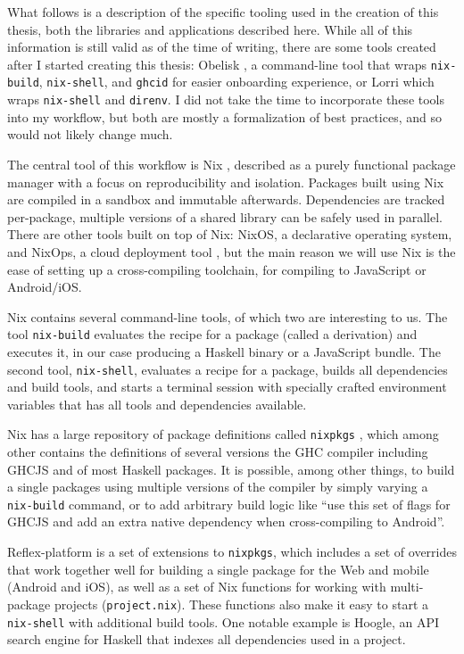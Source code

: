 \documentclass[english,zadani,odsaz]{fitthesis}
\begin{document}
What follows is a description of the specific tooling used in the creation of
this thesis, both the libraries and applications described here. While all of
this information is still valid as of the time of writing, there are some tools
created after I started creating this thesis: Obelisk \cite{obelisk}, a
command-line tool that wraps \texttt{nix-build}, \texttt{nix-shell}, and \texttt{ghcid} for easier
onboarding experience, or Lorri \cite{lorri} which wraps \texttt{nix-shell} and \texttt{direnv}. I
did not take the time to incorporate these tools into my workflow, but both are
mostly a formalization of best practices, and so would not likely change much.

The central tool of this workflow is Nix \cite{dolstra2006purely}, described as a
purely functional package manager with a focus on reproducibility and
isolation. Packages built using Nix are compiled in a sandbox and immutable
afterwards. Dependencies are tracked per-package, multiple versions of a shared
library can be safely used in parallel. There are other tools built on top of
Nix: NixOS, a declarative operating system, and NixOps, a cloud deployment tool
\cite{dolstra2008nixos}, but the main reason we will use Nix is the ease of
setting up a cross-compiling toolchain, for compiling to JavaScript or
Android/iOS.

Nix contains several command-line tools, of which two are interesting
to us. The tool \texttt{nix-build} evaluates the recipe for a package (called a
derivation) and executes it, in our case producing a Haskell binary or a
JavaScript bundle. The second tool, \texttt{nix-shell}, evaluates a recipe for a package,
builds all dependencies and build tools, and starts a terminal session with
specially crafted environment variables that has all tools and dependencies
available.

Nix has a large repository of package definitions called \texttt{nixpkgs} \cite{nixpkgs},
which among other contains the definitions of several versions the GHC compiler
including GHCJS and of most Haskell packages. It is possible, among other
things, to build a single packages using multiple versions of the compiler by
simply varying a \texttt{nix-build} command, or to add arbitrary build logic like ``use
this set of flags for GHCJS and add an extra native dependency when
cross-compiling to Android''.

Reflex-platform is a set of extensions to \texttt{nixpkgs}, which includes a set of
overrides that work together well for building a single package for the Web and
mobile (Android and iOS), as well as a set of Nix functions for working with
multi-package projects (\texttt{project.nix}). These functions also make it easy to start
a \texttt{nix-shell} with additional build tools. One notable example is Hoogle, an API
search engine for Haskell that indexes all dependencies used in a project.
\end{document}
